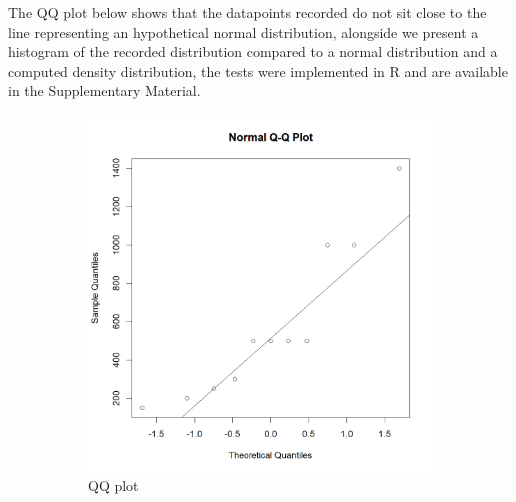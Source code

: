 \documentclass[a4paper,english,12pt,bibliography=totoc]{scrreprt}
\begin{document}
The QQ plot below shows that the datapoints recorded do not sit close to the line representing an hypothetical normal distribution,  alongside we present a histogram of the recorded distribution compared to a normal distribution and a computed density  distribution, the tests were implemented in R and are available in the Supplementary Material.
\\

\begin{figure}[htbp]
    \centering
    \begin{subfigure}[b]{0.49\textwidth}
        \includegraphics[width=\textwidth]{Images/qqplot.png}
        \caption{QQ plot }
        \label{fig:figure1}
    \end{subfigure}
    \hfill
    \begin{subfigure}[b]{0.49\textwidth}

\end{subfigure}
\end{figure}
\end{document}
